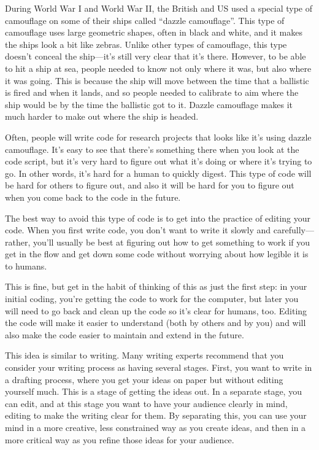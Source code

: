 \documentclass[]{tufte-book}
\begin{document}
During World War I and World War II, the British and US used a special type of
camouflage on some of their ships called ``dazzle camouflage''. This type of
camouflage uses large geometric shapes, often in black and white, and it makes
the ships look a bit like zebras. Unlike other types of camouflage, this type
doesn't conceal the ship---it's still very clear that it's there. However, to be
able to hit a ship at sea, people needed to know not only where it was, but also
where it was going. This is because the ship will move between the time that a
ballistic is fired and when it lands, and so people needed to calibrate to aim
where the ship would be by the time the ballistic got to it. Dazzle camouflage
makes it much harder to make out where the ship is headed.

Often, people will write code for research projects that looks like it's using
dazzle camouflage. It's easy to see that there's something there when you look
at the code script, but it's very hard to figure out what it's doing or where
it's trying to go. In other words, it's hard for a human to quickly digest. This
type of code will be hard for others to figure out, and also it will be hard for
you to figure out when you come back to the code in the future.

The best way to avoid this type of code is to get into the practice of editing
your code. When you first write code, you don't want to write it slowly and
carefully---rather, you'll usually be best at figuring out how to get something
to work if you get in the flow and get down some code without worrying about how
legible it is to humans.

This is fine, but get in the habit of thinking of this as just the first step:
in your initial coding, you're getting the code to work for the computer, but
later you will need to go back and clean up the code so it's clear for humans,
too. Editing the code will make it easier to understand (both by others and by
you) and will also make the code easier to maintain and extend in the future.

This idea is similar to writing. Many writing experts recommend that you consider
your writing process as having several stages. First, you want to write in a
drafting process, where you get your ideas on paper but without editing yourself
much. This is a stage of getting the ideas out. In a separate stage, you can
edit, and at this stage you want to have your audience clearly in mind, editing
to make the writing clear for them. By separating this, you can use your mind
in a more creative, less constrained way as you create ideas, and then in a
more critical way as you refine those ideas for your audience.
\end{document}
